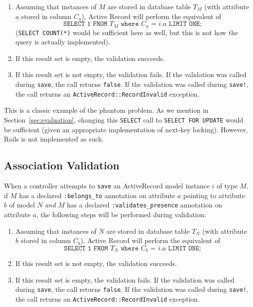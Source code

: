 \begin{enumerate} 

\item Assuming that instances of $M$ are stored in database table $T_M$ (with attribute $a$ stored in column $C_a$), Active Record will perform the equivalent of $$\texttt{SELECT 1 FROM $T_M$ where $C_a$ = $i.a$ LIMIT ONE;}$$ (\texttt{SELECT COUNT(*)} would be sufficient here as well, but this is not how the query is actually implemented).

\item If this result set is empty, the validation succeeds.

\item If this result set is not empty, the validation fails. If the validation was called during \texttt{save}, the call returns \texttt{false}. If the validation was called during \texttt{save!}, the call returns an \texttt{ActiveRecord::RecordInvalid} exception.

\end{enumerate}

This is a classic example of the phantom problem. As we mention in Section~\ref{sec:evaluation}, changing this \texttt{SELECT} call to \texttt{SELECT FOR UPDATE} would be sufficient (given an appropriate implementation of next-key locking). However, Rails is not implemented as such.

\subsection{Association Validation}
\label{sec:appendix-association-behavior}

 When a controller attempts to \texttt{save} an ActiveRecord model instance $i$ of type $M$, if $M$ has a declared \texttt{:belongs\_to} annotation on attribute $a$ pointing to attribute $b$ of model $N$ \textit{and} $M$ has a declared \texttt{:validates\_presence} annotation on attribute $a$, the following steps will be performed during validation:

\begin{enumerate} 

\item Assuming that instances of $N$ are stored in database table $T_N$ (with attribute $b$ stored in column $C_b$), Active Record will perform the equivalent of $$\texttt{SELECT 1 FROM $T_N$ where $C_b$ = $i.a$ LIMIT ONE;}$$

\item If this result set is not empty, the validation succeeds.

\item If this result set is empty, the validation fails. If the validation was called during \texttt{save}, the call returns \texttt{false}. If the validation was called during \texttt{save!}, the call returns an \texttt{ActiveRecord::RecordInvalid} exception.

\end{enumerate}

